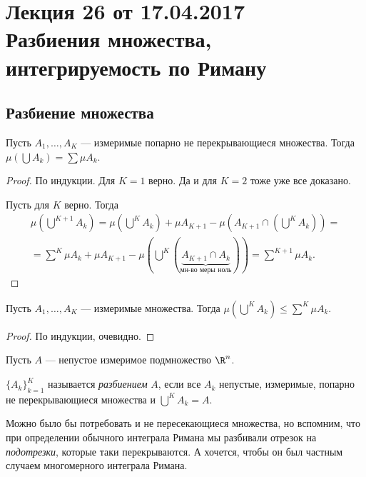 \pagestyle{fancy}
\section{Лекция 26 от 17.04.2017 \\ Разбиения множества, интегрируемость по Риману}

\subsection{Разбиение множества}

\begin{Statement}
Пусть $A_1, \ldots, A_K$ --- измеримые попарно не перекрывающиеся множества. Тогда $\mu (\bigcup A_k) = \sum \mu A_k$.
\end{Statement}
\begin{proof}
По индукции. Для $K = 1$ верно. Да и для $K = 2$ тоже уже все доказано.

Пусть для $K$ верно. Тогда
\begin{gather*}
\mu\left(\bigcup\limits^{K+1} A_k\right) = \mu\left(\bigcup\limits^K A_k\right) + \mu A_{K+1} - \mu\left(A_{K+1} \cap \left( \bigcup\limits^K A_k \right)\right) = \\ = \sum\limits^K\mu A_k + \mu A_{K+1} - \mu \left( \bigcup\limits^K\left(\underbrace{A_{K+1} \cap A_k}_{\text{мн-во меры ноль}} \right) \right) = \sum\limits^{K+1}\mu A_k.
\end{gather*}
\end{proof}

\begin{Statement}
Пусть $A_1, \ldots, A_K$ --- измеримые множества. Тогда $\mu\left( \bigcup\limits^K A_k \right) \leq \sum\limits^K \mu A_k$.
\end{Statement}
\begin{proof}
По индукции, очевидно.
\end{proof}

Пусть $A$ --- непустое измеримое подмножество $\R^n$.

\begin{Def}
$\{ A_k \}_{k=1}^K$ называется \textit{разбиением} $A$, если все $A_k$ непустые, измеримые, попарно не перекрывающиеся множества и $\bigcup\limits^K A_k = A$.
\end{Def}

Можно было бы потребовать и не пересекающиеся множества, но вспомним, что при определении обычного интеграла Римана мы разбивали отрезок на \textit{подотрезки}, которые таки перекрываются. А хочется, чтобы он был частным случаем многомерного интеграла Римана.

